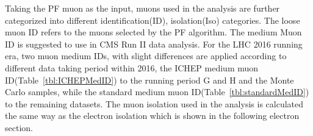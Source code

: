 Taking the PF muon as the input, muons used in the analysis are further categorized into different identification(ID), isolation(Iso) categories. The loose muon ID refers to the muons selected by the PF algorithm. The medium Muon ID is suggested to use in CMS Run II data analysis. For the LHC 2016 running era, two muon medium IDs, with slight differences are applied according to different data taking period within 2016, the ICHEP medium muon ID(Table~\ref{tbl:ICHEPMedID}) to the running period G and H and the Monte Carlo samples, while the standard medium muon ID(Table~\ref{tbl:standardMedID}) to the remaining datasets. The muon isolation used in the analysis is calculated the same way as the electron isolation which is shown in the following electron section.






